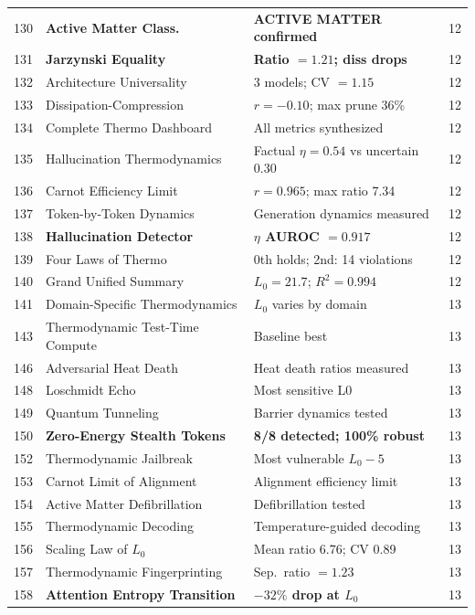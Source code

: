 \documentclass[11pt,a4paper]{article}
\begin{document}
\begin{center}
\begin{longtable}{@{}clll@{}}
130 & \textbf{Active Matter Class.} & \textbf{ACTIVE MATTER confirmed} & 12 \\
131 & \textbf{Jarzynski Equality} & \textbf{Ratio $= 1.21$; diss drops} & 12 \\
132 & Architecture Universality & 3 models; CV $= 1.15$ & 12 \\
133 & Dissipation-Compression & $r = -0.10$; max prune 36\% & 12 \\
134 & Complete Thermo Dashboard & All metrics synthesized & 12 \\
135 & Hallucination Thermodynamics & Factual $\eta = 0.54$ vs uncertain $0.30$ & 12 \\
136 & Carnot Efficiency Limit & $r = 0.965$; max ratio 7.34 & 12 \\
137 & Token-by-Token Dynamics & Generation dynamics measured & 12 \\
138 & \textbf{Hallucination Detector} & \textbf{$\eta$ AUROC $= 0.917$} & 12 \\
139 & Four Laws of Thermo & 0th holds; 2nd: 14 violations & 12 \\
140 & Grand Unified Summary & $L_0 = 21.7$; $R^2 = 0.994$ & 12 \\
\midrule
141 & Domain-Specific Thermodynamics & $L_0$ varies by domain & 13 \\
143 & Thermodynamic Test-Time Compute & Baseline best & 13 \\
146 & Adversarial Heat Death & Heat death ratios measured & 13 \\
148 & Loschmidt Echo & Most sensitive L0 & 13 \\
149 & Quantum Tunneling & Barrier dynamics tested & 13 \\
150 & \textbf{Zero-Energy Stealth Tokens} & \textbf{8/8 detected; 100\% robust} & 13 \\
152 & Thermodynamic Jailbreak & Most vulnerable $L_0 - 5$ & 13 \\
153 & Carnot Limit of Alignment & Alignment efficiency limit & 13 \\
154 & Active Matter Defibrillation & Defibrillation tested & 13 \\
155 & Thermodynamic Decoding & Temperature-guided decoding & 13 \\
156 & Scaling Law of $L_0$ & Mean ratio 6.76; CV 0.89 & 13 \\
157 & Thermodynamic Fingerprinting & Sep.\ ratio $= 1.23$ & 13 \\
158 & \textbf{Attention Entropy Transition} & \textbf{$-32\%$ drop at $L_0$} & 13 \\

\end{longtable}
\end{center}
\end{document}
